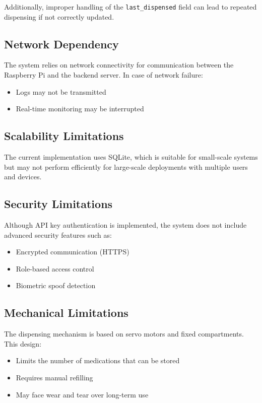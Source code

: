 Additionally, improper handling of the \texttt{last\_dispensed} field can lead to repeated dispensing if not correctly updated.

\subsection{Network Dependency}

The system relies on network connectivity for communication between the Raspberry Pi and the backend server. In case of network failure:

\begin{itemize}
    \item Logs may not be transmitted
    \item Real-time monitoring may be interrupted
\end{itemize}

\subsection{Scalability Limitations}

The current implementation uses SQLite, which is suitable for small-scale systems but may not perform efficiently for large-scale deployments with multiple users and devices.

\subsection{Security Limitations}

Although API key authentication is implemented, the system does not include advanced security features such as:

\begin{itemize}
    \item Encrypted communication (HTTPS)
    \item Role-based access control
    \item Biometric spoof detection
\end{itemize}

\subsection{Mechanical Limitations}

The dispensing mechanism is based on servo motors and fixed compartments. This design:

\begin{itemize}
    \item Limits the number of medications that can be stored
    \item Requires manual refilling
    \item May face wear and tear over long-term use
\end{itemize}